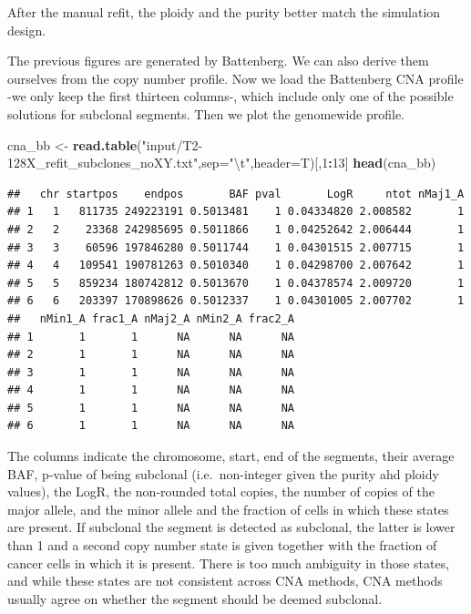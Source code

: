 \documentclass[]{article}
\newenvironment{Shaded}{\begin{snugshade}}{\end{snugshade}}
\newcommand{\CharTok}[1]{\textcolor[rgb]{0.31,0.60,0.02}{#1}}
\newcommand{\DataTypeTok}[1]{\textcolor[rgb]{0.13,0.29,0.53}{#1}}
\newcommand{\DecValTok}[1]{\textcolor[rgb]{0.00,0.00,0.81}{#1}}
\newcommand{\KeywordTok}[1]{\textcolor[rgb]{0.13,0.29,0.53}{\textbf{#1}}}
\newcommand{\NormalTok}[1]{#1}
\newcommand{\OperatorTok}[1]{\textcolor[rgb]{0.81,0.36,0.00}{\textbf{#1}}}
\newcommand{\StringTok}[1]{\textcolor[rgb]{0.31,0.60,0.02}{#1}}
\begin{document}
After the manual refit, the ploidy and the purity better match the
simulation design.

The previous figures are generated by Battenberg. We can also derive
them ourselves from the copy number profile. Now we load the Battenberg
CNA profile -we only keep the first thirteen columns-, which include
only one of the possible solutions for subclonal segments. Then we plot
the genomewide profile.

\begin{Shaded}
\begin{Highlighting}[]
\NormalTok{cna_bb <-}\StringTok{ }\KeywordTok{read.table}\NormalTok{(}\StringTok{"input/T2-128X_refit_subclones_noXY.txt"}\NormalTok{,}\DataTypeTok{sep=}\StringTok{"}\CharTok{\textbackslash{}t}\StringTok{"}\NormalTok{,}\DataTypeTok{header=}\NormalTok{T)[,}\DecValTok{1}\OperatorTok{:}\DecValTok{13}\NormalTok{]}
\KeywordTok{head}\NormalTok{(cna_bb)}
\end{Highlighting}
\end{Shaded}

\begin{verbatim}
##   chr startpos    endpos       BAF pval       LogR     ntot nMaj1_A
## 1   1   811735 249223191 0.5013481    1 0.04334820 2.008582       1
## 2   2    23368 242985695 0.5011866    1 0.04252642 2.006444       1
## 3   3    60596 197846280 0.5011744    1 0.04301515 2.007715       1
## 4   4   109541 190781263 0.5010340    1 0.04298700 2.007642       1
## 5   5   859234 180742812 0.5013670    1 0.04378574 2.009720       1
## 6   6   203397 170898626 0.5012337    1 0.04301005 2.007702       1
##   nMin1_A frac1_A nMaj2_A nMin2_A frac2_A
## 1       1       1      NA      NA      NA
## 2       1       1      NA      NA      NA
## 3       1       1      NA      NA      NA
## 4       1       1      NA      NA      NA
## 5       1       1      NA      NA      NA
## 6       1       1      NA      NA      NA
\end{verbatim}

The columns indicate the chromosome, start, end of the segments, their
average BAF, p-value of being subclonal (i.e.~non-integer given the
purity ahd ploidy values), the LogR, the non-rounded total copies, the
number of copies of the major allele, and the minor allele and the
fraction of cells in which these states are present. If subclonal the
segment is detected as subclonal, the latter is lower than 1 and a
second copy number state is given together with the fraction of cancer
cells in which it is present. There is too much ambiguity in those
states, and while these states are not consistent across CNA methods,
CNA methods usually agree on whether the segment should be deemed
subclonal.
\end{document}

